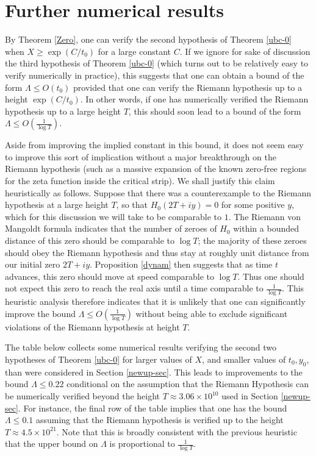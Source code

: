 \section{Further numerical results}\label{further-sec}

By Theorem \ref{Zero}, one can verify the second hypothesis of Theorem \ref{ubc-0} when $X \geq \exp(C/t_0)$ for a large constant $C$.  If we ignore for sake of discussion the third hypothesis of Theorem \ref{ubc-0} (which turns out to be relatively easy to verify numerically in practice), this suggests that one can obtain a bound of the form $\Lambda \leq O(t_0)$ provided that one can verify the Riemann hypothesis up to a height $\exp(C/t_0)$.  In other words, if one has numerically verified the Riemann hypothesis up to a large height $T$, this should soon lead to a bound of the form $\Lambda \leq O \left( \frac{1}{\log T} \right )$.

Aside from improving the implied constant in this bound, it does not seem easy to improve this sort of implication without a major breakthrough on the Riemann hypothesis (such as a massive expansion of the known zero-free regions for the zeta function inside the critical strip).  We shall justify this claim heuristically as follows. Suppose that there was a counterexample to the Riemann hypothesis at a large height $T$, so that $H_0(2T + iy) = 0$ for some positive $y$, which for this discussion we will take to be comparable to $1$.  The Riemann von Mangoldt formula indicates that the number of zeroes of $H_0$ within a bounded distance of this zero should be comparable to $\log T$; the majority of these zeroes should obey the Riemann hypothesis and thus stay at roughly unit distance from our initial zero $2T+iy$.  Proposition \ref{dynam} then suggests that as time $t$ advances, this zero should move at speed comparable to $\log T$.  Thus one should not expect this zero to reach the real axis until a time comparable to $\frac{1}{\log T}$.  This heuristic analysis therefore indicates that it is unlikely that one can significantly improve the bound $\Lambda \leq O \left( \frac{1}{\log T} \right )$ without being able to exclude significant violations of the Riemann hypothesis at height $T$.

The table below collects some numerical results verifying the second two hypotheses of Theorem \ref{ubc-0} for larger values of $X$, and smaller values of $t_0,y_0$, than were considered in Section \ref{newup-sec}.  This leads to improvements to the bound $\Lambda \leq 0.22$ conditional on the assumption that the Riemann Hypothesis can be numerically verified beyond the height $T \approx 3.06 \times 10^{10}$ used in Section \ref{newup-sec}.  For instance, the final row of the table implies that one has the bound $\Lambda \leq 0.1$ assuming that the Riemann hypothesis is verified up to the height $T \approx 4.5 \times 10^{21}$.  Note that this is broadly consistent with the previous heuristic that the upper bound on $\Lambda$ is proportional to $\frac{1}{\log T}$.

